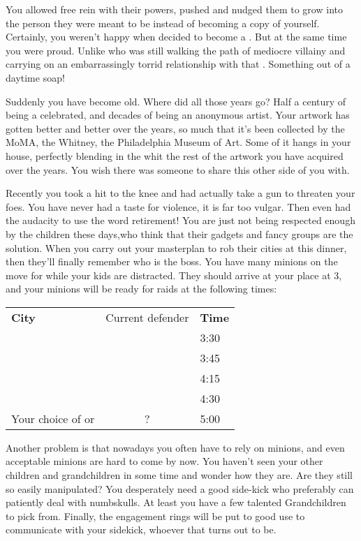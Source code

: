 \documentclass[char]{LRSguildcamp1}
\begin{document}
You allowed \cYoungest{} free rein with their powers, pushed and nudged them to grow into the person they were meant to be instead of becoming a copy of yourself. Certainly, you weren't happy when \cYoungest{\they} decided to become a \cYoungest{\hero}. But at the same time you were proud. Unlike \cOldest{} who was still walking the path of mediocre villainy and carrying on an embarrassingly torrid relationship with that \cOS{\hero}. Something out of a daytime soap! 

Suddenly you have become old. Where did all those years go? Half a century of being a celebrated\cGrandma{\villain}, and decades of being an anonymous artist. Your artwork has gotten better and better over the years, so much that it's been collected by the MoMA, the Whitney, the Philadelphia Museum of Art. Some of it hangs in your house, perfectly blending in the whit the rest of the artwork you have acquired over the years. You wish there was someone to share this other side of you with. 

Recently you took a hit to the knee and had actually take a gun to threaten your foes. You have never had a taste for violence, it is far too vulgar. Then \cOldest{} even had the audacity to use the word retirement! You are just not being respected enough by the children these days,who think that their gadgets and fancy groups are the solution. When you carry out your masterplan to rob their cities at this dinner, then they'll finally remember who is the boss.  You have many minions on the move for while your kids are distracted.  They should arrive at your place at 3, and your minions will be ready for raids at the following times:

\begin{tabular}{|l|c|l|}
{\bf City} & Current defender & {\bf Time} \\
\pCityYoungest{} & \cYoungest{} & 3:30 \\
\pCityO{} & \cOldest{} & 3:45 \\
\pCityYoungest{} & \cYoungest{} & 4:15 \\
\pCityO{} & \cOldest{} & 4:30 \\
Your choice of \pCityYoungest{} or \pCityO{} & ? & 5:00
\end{tabular}

Another problem is that nowadays you often have to rely on minions, and even acceptable minions are hard to come by now. You haven't seen your other children and grandchildren in some time and wonder how they are. Are they still so easily manipulated? You desperately need a good side-kick who preferably can patiently deal with numbskulls.  At least you have a few talented Grandchildren to pick from. Finally, the engagement rings will be put to good use to communicate with your sidekick, whoever that turns out to be. 
\end{document}
